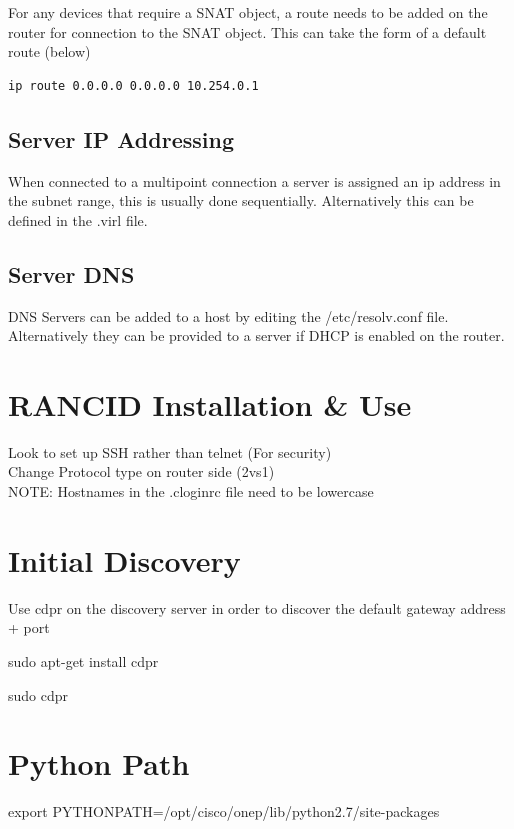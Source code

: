 \documentclass[11pt]{report}
\begin{document}
For any devices that require a SNAT object, a route needs to be added on the router for connection to the SNAT object. This can take the form of a default route (below)

\begin{lstlisting}
ip route 0.0.0.0 0.0.0.0 10.254.0.1
\end{lstlisting}

\subsection*{Server IP Addressing}

When connected to a multipoint connection a server is assigned an ip address in the subnet range, this is usually done sequentially. Alternatively this can be defined in the .virl file.

\subsection*{Server DNS}

DNS Servers can be added to a host by editing the /etc/resolv.conf file. Alternatively they can be provided to a server if DHCP is enabled on the router.

\section*{RANCID Installation \& Use}

Look to set up SSH rather than telnet (For security)
\\
Change Protocol type on router side (2vs1)
\\
NOTE: Hostnames in the .cloginrc file need to be lowercase

\section*{Initial Discovery}

Use cdpr on the discovery server in order to discover the default gateway address + port

sudo apt-get install cdpr

sudo cdpr

\section*{Python Path}

 export PYTHONPATH=/opt/cisco/onep/lib/python2.7/site-packages
 
\end{document}
